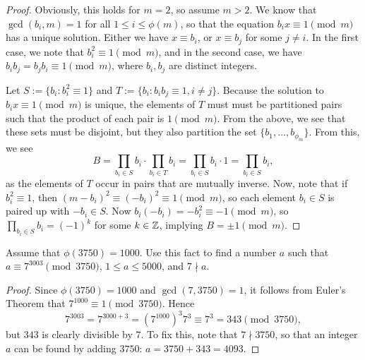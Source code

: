 \documentclass{article}
\begin{document}
\begin{proof}
Obviously, this holds for $m=2$, so assume $m>2$. We know that $\gcd(b_i, m) = 1$ for all $1\leq i \leq \phi(m)$, so that the equation $b_ix \equiv 1\pmod m$ has a unique solution. Either we have $x \equiv b_i$, or $x\equiv b_j$ for some $j\neq i$. In the first case, we note that $b_i^2\equiv 1 \pmod m$, and in the second case, we have $b_ib_j  = b_jb_i\equiv 1\pmod m$, where $b_i, b_j$ are distinct integers.

Let $S := \{b_i: b_i^2 \equiv 1\}$ and $T := \{b_i: b_ib_j \equiv 1, i\neq j\}$. Because the solution to $b_ix\equiv 1\pmod m$ is unique, the elements of $T$ must must be partitioned pairs such that the product of each pair is $1\pmod m$. From the above, we see that these sets must be disjoint, but they also partition the set $\{b_1, \ldots, b_{\phi_m}\}$. From this, we see
$$B = \prod_{b_i\in S} b_i \cdot \prod_{b_i\in T} b_i = \prod_{b_i\in S}b_i\cdot 1 = \prod_{b_i\in S} b_i,$$
as the elements of $T$ occur in pairs that are mutually inverse. Now, note that if $b_i^2\equiv 1$, then $(m-b_i)^2 \equiv (-b_i)^2 \equiv 1 \pmod m$, so each element $b_i\in S$ is paired up with $-b_i\in S$. Now $b_i(-b_i) = -b_i^2 \equiv -1 \pmod m$, so $\prod_{b_i\in S}b_i = (-1)^k$ for some $k\in \mathbb Z$, implying $B = \pm 1 \pmod m$.
\end{proof}

\begin{exercise}[Chapter 10, \#2]
Assume that $\phi(3750) = 1000$. Use this fact to find a number $a$ such that $a\equiv 7^{3003} \pmod{3750}$, $1\leq a \leq 5000$, and $7\nmid a$.
\end{exercise}
\begin{proof}
Since $\phi(3750) = 1000$ and $\gcd(7, 3750) = 1$, it follows from Euler's Theorem that $7^{1000} \equiv 1\pmod{3750}$. Hence
$$7^{3003}= 7^{3000 + 3} = (7^{1000})^3 7^3 \equiv 7^3 = 343\pmod{3750},$$
but $343$ is clearly divisible by $7$. To fix this, note that $7\nmid 3750$, so that an integer $a$ can be found by adding $3750$: $a = 3750 + 343 = \boxed{4093}$.
\end{proof}
\end{document}
